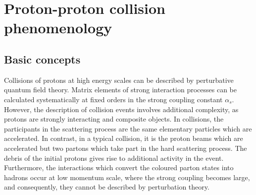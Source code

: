 %
\chapter{Proton-proton collision phenomenology}
\label{sec:pp}

\section{Basic concepts}
\label{sec:pp:basics}
Collisions of protons at high energy scales can be described by perturbative quantum field theory. Matrix elements of strong interaction processes can be calculated systematically at fixed orders in the strong coupling constant \(\alpha_{s}\). However, the description of \HepProcess{\Pp\Pp} collision events involves additional complexity, as protons are strongly interacting and composite objects. In \HepProcess{\Pem\Pep} collisions, the participants in the scattering process are the same elementary particles which are accelerated. In contrast, in a typical \HepProcess{\Pp\Pp} collision, it is the proton beams which are accelerated but two partons which take part in the hard scattering process. The debris of the initial protons gives rise to additional activity in the event.
Furthermore, the interactions which convert the coloured parton states into hadrons occur at low momentum scale, where the strong coupling becomes large, and consequently, they cannot be described by perturbation theory.

